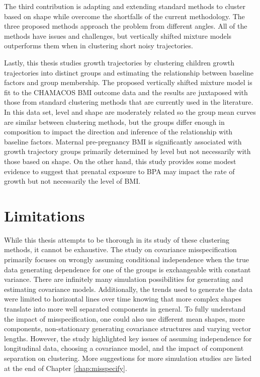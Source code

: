 The third contribution is adapting and extending standard methods to cluster based on shape while overcome the shortfalls of the current methodology. The three proposed methods approach the problem from different angles. All of the methods have issues and challenges, but vertically shifted mixture models outperforms them when in clustering short noisy trajectories.

Lastly, this thesis studies growth trajectories by clustering children growth trajectories into distinct groups and estimating the relationship between baseline factors and group membership. The proposed vertically shifted mixture model is fit to the CHAMACOS BMI outcome data and the results are juxtaposed with those from standard clustering methods that are currently used in the literature. In this data set, level and shape are moderately related so the group mean curves are similar between clustering methods, but the groups differ enough in composition to impact the direction and inference of the relationship with baseline factors. Maternal pre-pregnancy BMI is significantly associated with growth trajectory groups primarily determined by level but not necessarily with those based on shape. On the other hand, this study provides some modest evidence to suggest that prenatal exposure to BPA may impact the rate of growth but not necessarily the level of BMI.

\section{Limitations}
While this thesis attempts to be thorough in its study of these clustering methods, it cannot be exhaustive. The study on covariance misspecification primarily focuses on wrongly assuming conditional independence when the true data generating dependence for one of the groups is exchangeable with constant variance. There are infinitely many simulation possibilities for generating and estimating covariance models. Additionally, the trends used to generate the data were limited to horizontal lines over time knowing that more complex shapes translate into more well separated components in general. To fully understand the impact of misspecification, one could also use different mean shapes, more components, non-stationary generating covariance structures and varying vector lengths. However, the study highlighted key issues of assuming independence for longitudinal data, choosing a covariance model, and the impact of component separation on clustering. More suggestions for more simulation studies are listed at the end of Chapter \ref{chap:misspecify}. 

